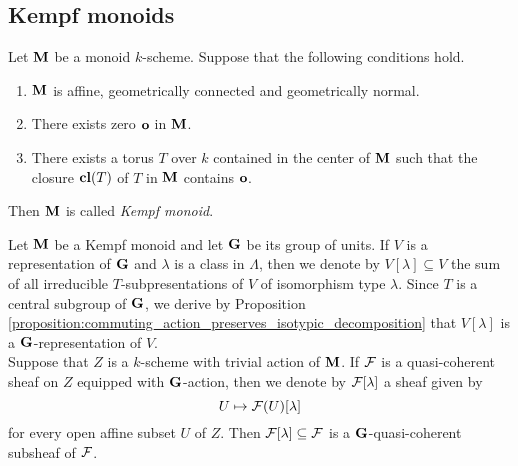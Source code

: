 \subsection{Kempf monoids}

\begin{definition}
Let $\mathbf{M}$ be a monoid $k$-scheme. Suppose that the following conditions hold.
\begin{enumerate}[label=\textbf{(\arabic*)}, leftmargin=1.5em]
\item $\mathbf{M}$ is affine, geometrically connected and geometrically normal.
\item There exists zero $\mathbf{o}$ in $\mathbf{M}$.
\item There exists a torus $T$ over $k$ contained in the center of $\mathbf{M}$ such that the closure $\mathbf{cl}(T)$ of $T$ in $\mathbf{M}$ contains $\mathbf{o}$.
\end{enumerate}
Then $\mathbf{M}$ is called \textit{Kempf  monoid}.
\end{definition}
\noindent
Let $\mathbf{M}$ be a Kempf monoid and let $\mathbf{G}$ be its group of units. If $V$ is a representation of $\mathbf{G}$ and $\lambda$ is a class in $\Lambda$, then we denote by $V[\lambda]\subseteq V$ the sum of all irreducible $T$-subpresentations of $V$ of isomorphism type $\lambda$. Since $T$ is a central subgroup of $\mathbf{G}$, we derive by Proposition \ref{proposition:commuting_action_preserves_isotypic_decomposition} that $V[\lambda]$ is a $\mathbf{G}$-representation of $V$.\\
Suppose that $Z$ is a $k$-scheme with trivial action of $\mathbf{M}$. If ${\mathcal F}$ is a quasi-coherent sheaf on $Z$ equipped with $\mathbf{G}$-action, then we denote by ${\mathcal F}[\lambda]$ a sheaf given by
$$U\mapsto {\mathcal F}(U)[\lambda]$$
for every open affine subset $U$ of $Z$. Then ${\mathcal F}[\lambda]\subseteq {\mathcal F}$ is a $\mathbf{G}$-quasi-coherent subsheaf of ${\mathcal F}$.



